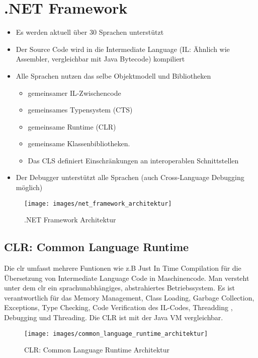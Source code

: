 \section{.NET Framework}
\begin{itemize}
	\item Es werden aktuell über 30 Sprachen unterstützt
	\item Der Source Code wird in die Intermediate Language  (IL: Ähnlich wie Assembler, vergleichbar mit Java Bytecode) kompiliert
	\item Alle Sprachen nutzen das selbe Objektmodell und Bibliotheken
	\begin{itemize}
		\item gemeinsamer IL-Zwischencode
		\item gemeinsames Typensystem (CTS)
		\item gemeinsame Runtime (CLR)
		\item gemeinsame Klassenbibliotheken.
		\item Das CLS definiert Einschränkungen an interoperablen Schnittstellen
	\end{itemize}
	\item Der Debugger unterstützt alle Sprachen (auch Cross-Language Debugging möglich)
\end{itemize}
\begin{figure}[h]
\centering
\texttt{[image: images/net\_framework\_architektur]}
\caption{.NET Framework Architektur}
\label{fig:netframeworkarchitektur}
\end{figure}

\subsection{CLR: Common Language Runtime}
Die \gls{clr} umfasst mehrere Funtionen wie z.B Just In Time Compilation für die Übersetzung von Intermediate Language Code in Maschinencode. Man versteht unter dem \gls{clr} ein sprachunabhängiges, abstrahiertes Betriebssystem. Es ist verantwortlich für das Memory Management, Class Loading, Garbage Collection, Exceptions, Type Checking, Code Verification des IL-Codes, Threadding
, Debugging und Threading. Die CLR ist mit der Java VM vergleichbar.
\begin{figure}[h]
\centering
\texttt{[image: images/common\_language\_runtime\_architektur]}
\caption{CLR: Common Language Runtime Architektur}
\label{fig:commonlanguageruntimearchitektur}
\end{figure}

